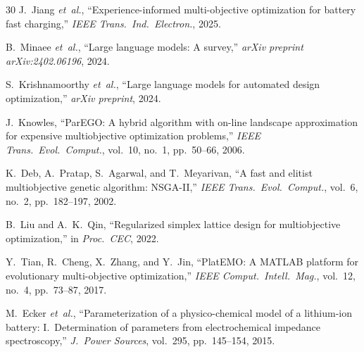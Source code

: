 \documentclass[lettersize,journal]{IEEEtran}
\begin{document}
\begin{thebibliography}{30}
J.~Jiang \textit{et~al.}, ``Experience-informed multi-objective optimization for battery fast charging,'' \textit{IEEE Trans.\ Ind.\ Electron.}, 2025.

B.~Minaee \textit{et~al.}, ``Large language models: A survey,'' \textit{arXiv preprint arXiv:2402.06196}, 2024.

S.~Krishnamoorthy \textit{et~al.}, ``Large language models for automated design optimization,'' \textit{arXiv preprint}, 2024.

J.~Knowles, ``ParEGO: A hybrid algorithm with on-line landscape approximation for expensive multiobjective optimization problems,'' \textit{IEEE Trans.\ Evol.\ Comput.}, vol.~10, no.~1, pp.~50--66, 2006.

K.~Deb, A.~Pratap, S.~Agarwal, and T.~Meyarivan, ``A fast and elitist multiobjective genetic algorithm: NSGA-II,'' \textit{IEEE Trans.\ Evol.\ Comput.}, vol.~6, no.~2, pp.~182--197, 2002.

B.~Liu and A.~K.~Qin, ``Regularized simplex lattice design for multiobjective optimization,'' in \textit{Proc.\ CEC}, 2022.

Y.~Tian, R.~Cheng, X.~Zhang, and Y.~Jin, ``PlatEMO: A MATLAB platform for evolutionary multi-objective optimization,'' \textit{IEEE Comput.\ Intell.\ Mag.}, vol.~12, no.~4, pp.~73--87, 2017.

M.~Ecker \textit{et~al.}, ``Parameterization of a physico-chemical model of a lithium-ion battery: I.\ Determination of parameters from electrochemical impedance spectroscopy,'' \textit{J.\ Power Sources}, vol.~295, pp.~145--154, 2015.

\end{thebibliography}
\end{document}
